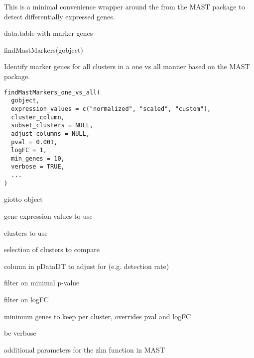 \documentclass[a4paper]{book}
\begin{document}
%
\begin{Details}\relax
This is a minimal convenience wrapper around the 
from the MAST package to detect differentially expressed genes.
\end{Details}
%
\begin{Value}
data.table with marker genes
\end{Value}
%
\begin{Examples}
\begin{ExampleCode}
    findMastMarkers(gobject)
\end{ExampleCode}
\end{Examples}
%
\begin{Description}\relax
Identify marker genes for all clusters in a one vs all manner based on the MAST package.
\end{Description}
%
\begin{Usage}
\begin{verbatim}
findMastMarkers_one_vs_all(
  gobject,
  expression_values = c("normalized", "scaled", "custom"),
  cluster_column,
  subset_clusters = NULL,
  adjust_columns = NULL,
  pval = 0.001,
  logFC = 1,
  min_genes = 10,
  verbose = TRUE,
  ...
)
\end{verbatim}
\end{Usage}
%
\begin{Arguments}
\begin{ldescription}
\item[\code{gobject}] giotto object

\item[\code{expression\_values}] gene expression values to use

\item[\code{cluster\_column}] clusters to use

\item[\code{subset\_clusters}] selection of clusters to compare

\item[\code{adjust\_columns}] column in pDataDT to adjust for (e.g. detection rate)

\item[\code{pval}] filter on minimal p-value

\item[\code{logFC}] filter on logFC

\item[\code{min\_genes}] minimum genes to keep per cluster, overrides pval and logFC

\item[\code{verbose}] be verbose

\item[\code{...}] additional parameters for the zlm function in MAST
\end{ldescription}
\end{Arguments}
\end{document}
